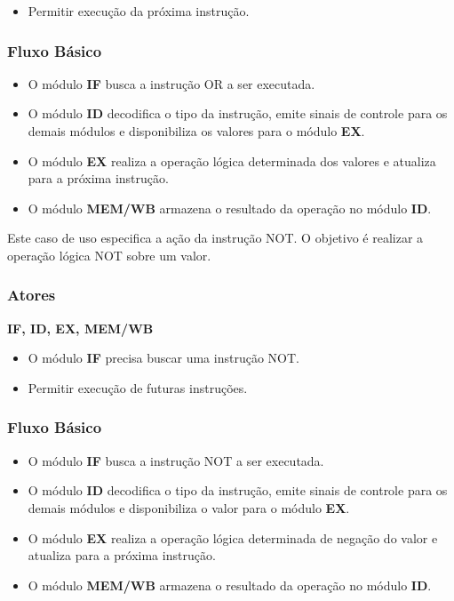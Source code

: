\postconditions
\begin{itemize}	
  \item Permitir execução da próxima instrução.
\end{itemize}

\subsubsection*{Fluxo Básico}
\begin{itemize}
\item O módulo \textbf{IF} busca a instrução OR a ser executada.
\item O módulo \textbf{ID} decodifica o tipo da instrução, emite sinais de controle para os demais módulos e disponibiliza os valores para o módulo \textbf{EX}.
\item O módulo \textbf{EX} realiza a operação lógica determinada dos valores e atualiza para a próxima instrução.
\item O módulo \textbf{MEM/WB} armazena o resultado da operação no módulo \textbf{ID}.
\end{itemize}


Este caso de uso especifica a ação da instrução NOT. O objetivo é realizar a operação lógica NOT sobre um valor.
 
\subsubsection*{Atores}
\textbf{IF, ID, EX, MEM/WB}

\preconditions 
\begin{itemize}
 \item O módulo \textbf{IF} precisa buscar uma instrução NOT.
\end{itemize}

\postconditions
\begin{itemize}	
  \item Permitir execução de futuras instruções.
\end{itemize}

\subsubsection*{Fluxo Básico}
\begin{itemize}
\item O módulo \textbf{IF} busca a instrução NOT a ser executada.
\item O módulo \textbf{ID} decodifica o tipo da instrução, emite sinais de controle para os demais módulos e disponibiliza o valor para o módulo \textbf{EX}.
\item O módulo \textbf{EX} realiza a operação lógica determinada de negação do valor e atualiza para a próxima instrução.
\item O módulo \textbf{MEM/WB} armazena o resultado da operação no módulo \textbf{ID}.
\end{itemize}

